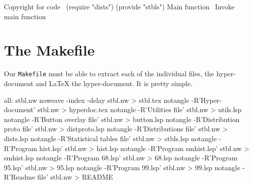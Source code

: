 \nwenddocs{}\endmoddef
\LA{}Copyright for code~{\nwtagstyle{}}\RA{}
(require "dists")
(provide "stbls")
\LA{}Main function~{\nwtagstyle{}}\RA{}
\LA{}Invoke main function~{\nwtagstyle{}}\RA{}
\nwendcode{}\nwdocspar

\section{The Makefile}
\label{sec:makefile}
Our {\tt{}Makefile} must be able to extract each of the individual files,
the hyper-document and \LaTeX{} the hyper-document. It is pretty
simple.

\nwenddocs{}\endmoddef
all:    stbl.nw
        noweave -index -delay stbl.nw > stbl.tex
        notangle -R'Hyper-document' stbl.nw > hyperdoc.tex
        notangle -R'Utilities file' stbl.nw > utils.lsp
        notangle -R'Button overlay file' stbl.nw > button.lsp
        notangle -R'Distribution proto file' stbl.nw > distproto.lsp
        notangle -R'Distributions file' stbl.nw > dists.lsp
        notangle -R'Statistical tables file' stbl.nw > stbls.lsp
        notangle -R'Program hist.lsp' stbl.nw > hist.lsp
        notangle -R'Program smhist.lsp' stbl.nw > smhist.lsp
        notangle -R'Program 68.lsp' stbl.nw > 68.lsp
        notangle -R'Program 95.lsp' stbl.nw > 95.lsp
        notangle -R'Program 99.lsp' stbl.nw > 99.lsp
        notangle -R'Readme file' stbl.nw > README

\nwendcode{}\nwdocspar
